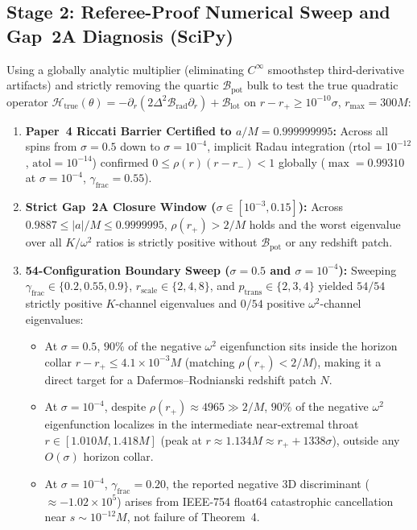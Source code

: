 \documentclass[11pt, a4paper]{article}
\theoremstyle{remark}
\begin{document}
\subsection{Stage 2: Referee-Proof Numerical Sweep and Gap~2A Diagnosis (SciPy)}

Using a globally analytic multiplier (eliminating $C^\infty$ smoothstep third-derivative artifacts) and strictly removing the quartic $\mathcal{B}_{\mathrm{pot}}$ bulk to test the true quadratic operator $\mathcal{H}_{\mathrm{true}}(\theta) = -\partial_r(2\Delta^2\mathcal{B}_{\mathrm{rad}}\partial_r) + \mathcal{B}_{\mathrm{lot}}$ on $r - r_+ \ge 10^{-10}\sigma$, $r_{\max} = 300M$:
\begin{enumerate}
\item \textbf{Paper~4 Riccati Barrier Certified to $a/M = 0.999999995$:} Across all spins from $\sigma = 0.5$ down to $\sigma = 10^{-4}$, implicit Radau integration ($\mathrm{rtol}=10^{-12}$, $\mathrm{atol}=10^{-14}$) confirmed $0 \le \rho(r)(r - r_-) < 1$ globally ($\max = 0.99310$ at $\sigma = 10^{-4}$, $\gamma_{\mathrm{frac}} = 0.55$).
\item \textbf{Strict Gap~2A Closure Window ($\sigma \in [10^{-3}, 0.15]$):} Across $0.9887 \le |a|/M \le 0.9999995$, $\rho(r_+) > 2/M$ holds and the worst eigenvalue over all $K/\omega^2$ ratios is strictly positive without $\mathcal{B}_{\mathrm{pot}}$ or any redshift patch.
\item \textbf{54-Configuration Boundary Sweep ($\sigma = 0.5$ and $\sigma = 10^{-4}$):} Sweeping $\gamma_{\mathrm{frac}} \in \{0.2, 0.55, 0.9\}$, $r_{\mathrm{scale}} \in \{2, 4, 8\}$, and $p_{\mathrm{trans}} \in \{2, 3, 4\}$ yielded $54/54$ strictly positive $K$-channel eigenvalues and $0/54$ positive $\omega^2$-channel eigenvalues:
\begin{itemize}
\item At $\sigma = 0.5$, $90\%$ of the negative $\omega^2$ eigenfunction sits inside the horizon collar $r - r_+ \le 4.1\times 10^{-3}M$ (matching $\rho(r_+) < 2/M$), making it a direct target for a Dafermos--Rodnianski redshift patch $N$.
\item At $\sigma = 10^{-4}$, despite $\rho(r_+) \approx 4965 \gg 2/M$, $90\%$ of the negative $\omega^2$ eigenfunction localizes in the intermediate near-extremal throat $r \in [1.010M, 1.418M]$ (peak at $r \approx 1.134M \approx r_+ + 1338\sigma$), outside any $O(\sigma)$ horizon collar.
\item At $\sigma = 10^{-4}$, $\gamma_{\mathrm{frac}} = 0.20$, the reported negative $3$D discriminant ($\approx -1.02\times 10^5$) arises from IEEE-754 float64 catastrophic cancellation near $s \sim 10^{-12}M$, not failure of Theorem~4.
\end{itemize}
\end{enumerate}
\end{document}
